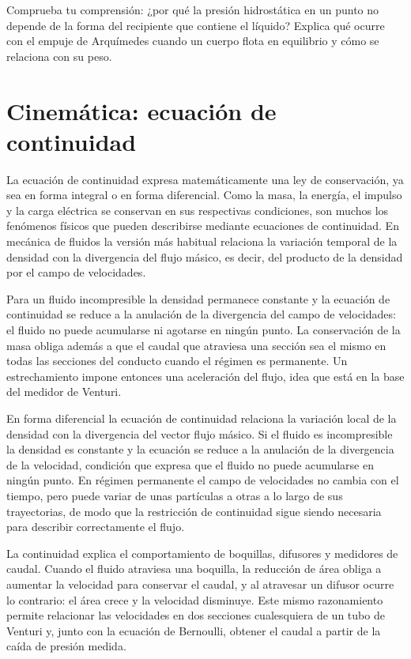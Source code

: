 \documentclass{book}
\begin{document}
\begin{tcolorbox}[title={Autoficha}, studiumcheck, breakable]

Comprueba tu comprensión: ¿por qué la presión hidrostática en un punto no depende de la forma del recipiente que contiene el líquido? Explica qué ocurre con el empuje de Arquímedes cuando un cuerpo flota en equilibrio y cómo se relaciona con su peso.
\end{tcolorbox}

\chapter{Cinemática: ecuación de continuidad}

La ecuación de continuidad expresa matemáticamente una ley de conservación, ya sea en forma integral o en forma diferencial. Como la masa, la energía, el impulso y la carga eléctrica se conservan en sus respectivas condiciones, son muchos los fenómenos físicos que pueden describirse mediante ecuaciones de continuidad. En mecánica de fluidos la versión más habitual relaciona la variación temporal de la densidad con la divergencia del flujo másico, es decir, del producto de la densidad por el campo de velocidades.

Para un fluido incompresible la densidad permanece constante y la ecuación de continuidad se reduce a la anulación de la divergencia del campo de velocidades: el fluido no puede acumularse ni agotarse en ningún punto. La conservación de la masa obliga además a que el caudal que atraviesa una sección sea el mismo en todas las secciones del conducto cuando el régimen es permanente. Un estrechamiento impone entonces una aceleración del flujo, idea que está en la base del medidor de Venturi.

En forma diferencial la ecuación de continuidad relaciona la variación local de la densidad con la divergencia del vector flujo másico. Si el fluido es incompresible la densidad es constante y la ecuación se reduce a la anulación de la divergencia de la velocidad, condición que expresa que el fluido no puede acumularse en ningún punto. En régimen permanente el campo de velocidades no cambia con el tiempo, pero puede variar de unas partículas a otras a lo largo de sus trayectorias, de modo que la restricción de continuidad sigue siendo necesaria para describir correctamente el flujo.

La continuidad explica el comportamiento de boquillas, difusores y medidores de caudal. Cuando el fluido atraviesa una boquilla, la reducción de área obliga a aumentar la velocidad para conservar el caudal, y al atravesar un difusor ocurre lo contrario: el área crece y la velocidad disminuye. Este mismo razonamiento permite relacionar las velocidades en dos secciones cualesquiera de un tubo de Venturi y, junto con la ecuación de Bernoulli, obtener el caudal a partir de la caída de presión medida.
\end{document}
